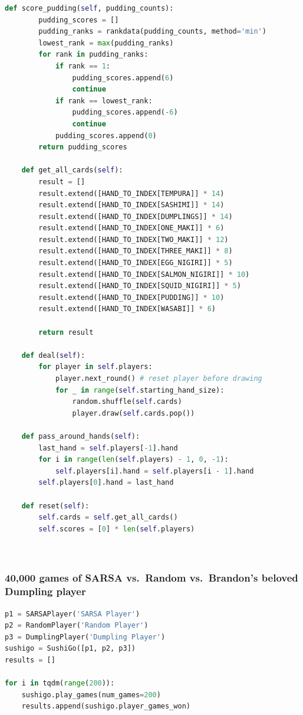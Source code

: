 \begin{lstlisting}[language=Python]
    def score_pudding(self, pudding_counts):
        pudding_scores = []
        pudding_ranks = rankdata(pudding_counts, method='min')
        lowest_rank = max(pudding_ranks)
        for rank in pudding_ranks:
            if rank == 1:
                pudding_scores.append(6)
                continue
            if rank == lowest_rank:
                pudding_scores.append(-6)
                continue
            pudding_scores.append(0)
        return pudding_scores
    
    def get_all_cards(self):
        result = []
        result.extend([HAND_TO_INDEX[TEMPURA]] * 14)
        result.extend([HAND_TO_INDEX[SASHIMI]] * 14)
        result.extend([HAND_TO_INDEX[DUMPLINGS]] * 14)
        result.extend([HAND_TO_INDEX[ONE_MAKI]] * 6)
        result.extend([HAND_TO_INDEX[TWO_MAKI]] * 12)
        result.extend([HAND_TO_INDEX[THREE_MAKI]] * 8)
        result.extend([HAND_TO_INDEX[EGG_NIGIRI]] * 5)
        result.extend([HAND_TO_INDEX[SALMON_NIGIRI]] * 10)
        result.extend([HAND_TO_INDEX[SQUID_NIGIRI]] * 5)
        result.extend([HAND_TO_INDEX[PUDDING]] * 10)
        result.extend([HAND_TO_INDEX[WASABI]] * 6)

        return result

    def deal(self):
        for player in self.players:
            player.next_round() # reset player before drawing
            for _ in range(self.starting_hand_size):
                random.shuffle(self.cards)
                player.draw(self.cards.pop())
    
    def pass_around_hands(self):
        last_hand = self.players[-1].hand
        for i in range(len(self.players) - 1, 0, -1):
            self.players[i].hand = self.players[i - 1].hand  
        self.players[0].hand = last_hand  

    def reset(self):
        self.cards = self.get_all_cards()
        self.scores = [0] * len(self.players)
   
        
\end{lstlisting}

\hypertarget{games-of-sarsa-vs.-random-vs.-brandons-beloved-dumpling-player}{%
\subsubsection{40,000 games of SARSA vs.~Random vs.~Brandon's beloved
Dumpling
player}\label{games-of-sarsa-vs.-random-vs.-brandons-beloved-dumpling-player}}

\begin{lstlisting}[language=Python]
p1 = SARSAPlayer('SARSA Player')
p2 = RandomPlayer('Random Player')
p3 = DumplingPlayer('Dumpling Player')
sushigo = SushiGo([p1, p2, p3])
results = []
  
for i in tqdm(range(200)):
    sushigo.play_games(num_games=200)
    results.append(sushigo.player_games_won)
\end{lstlisting}

